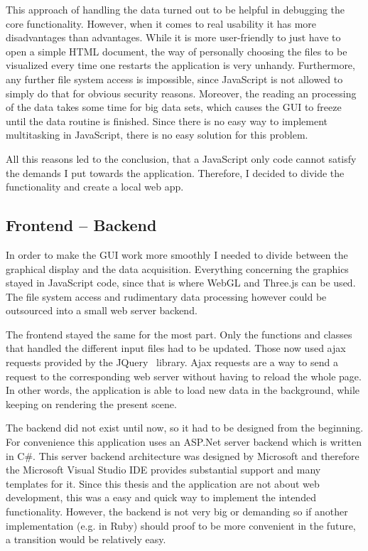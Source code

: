 This approach of handling the data turned out to be helpful in debugging the core functionality. However, when it comes to real usability it has more disadvantages than advantages. While it is more user-friendly to just have to open a simple HTML document, the way of personally choosing the files to be visualized every time one restarts the application is very unhandy. Furthermore, any further file system access is impossible, since JavaScript is not allowed to simply do that for obvious security reasons. Moreover, the reading an processing of the data takes some time for big data sets, which causes the GUI to freeze until the data routine is finished. Since there is no easy way to implement multitasking in JavaScript, there is no easy solution for this problem.

All this reasons led to the conclusion, that a JavaScript only code cannot satisfy the demands I put towards the application. Therefore, I decided to divide the functionality and create a local web app.
\subsection{Frontend -- Backend}
In order to make the GUI work more smoothly I needed to divide between the graphical display and the data acquisition. Everything concerning the graphics stayed in JavaScript code, since that is where WebGL and Three.js can be used. The file system access and rudimentary data processing however could be outsourced into a small web server backend.

The frontend stayed the same for the most part. Only the functions and classes that handled the different input files had to be updated. Those now used ajax requests provided by the JQuery~\cite{test} library. Ajax requests are a way to send a request to the corresponding web server without having to reload the whole page. In other words, the application is able to load new data in the background, while keeping on rendering the present scene.

The backend did not exist until now, so it had to be designed from the beginning. For convenience this application uses an ASP.Net server backend which is written in C\#. This server backend architecture was designed by Microsoft and therefore the Microsoft Visual Studio IDE provides substantial support and many templates for it. Since this thesis and the application are not about web development, this was a easy and quick way to implement the intended functionality. However, the backend is not very big or demanding so if another implementation (e.g. in Ruby) should proof to be more convenient in the future, a transition would be relatively easy.

